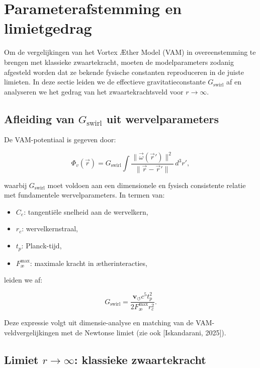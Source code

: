 \section{Parameterafstemming en limietgedrag}\label{sec:appendix_6}

Om de vergelijkingen van het Vortex Æther Model (VAM) in overeenstemming te brengen met klassieke zwaartekracht, moeten de modelparameters zodanig afgesteld worden dat ze bekende fysische constanten reproduceren in de juiste limieten. In deze sectie leiden we de effectieve gravitatieconstante $G_\text{swirl}$ af en analyseren we het gedrag van het zwaartekrachtsveld voor $r \to \infty$.

\subsection{Afleiding van $G_\text{swirl}$ uit wervelparameters}

De VAM-potentiaal is gegeven door:

\begin{equation}
\Phi_v(\vec{r}) = G_\text{swirl} \int \frac{\|\vec{\omega}(\vec{r}')\|^2}{\|\vec{r} - \vec{r}'\|} \, d^3r',
\end{equation}

waarbij $G_\text{swirl}$ moet voldoen aan een dimensionele en fysisch consistente relatie met fundamentele wervelparameters. In termen van:

\begin{itemize}
  \item $C_e$: tangentiële snelheid aan de wervelkern,
  \item $r_c$: wervelkernstraal,
  \item $t_p$: Planck-tijd,
  \item $F^{\text{max}}_{\text{\ae}}$: maximale kracht in ætherinteracties,
\end{itemize}

leiden we af:

\begin{equation}
G_\text{swirl} = \frac{\mathbf{v}_{\scriptscriptstyle\boldsymbol{\circlearrowleft}} c^5 t_p^2}{2 F^{\text{max}}_{\text{\ae}} r_c^2}.
\end{equation}

Deze expressie volgt uit dimensie-analyse en matching van de VAM-veldvergelijkingen met de Newtonse limiet (zie ook [Iskandarani, 2025]).

\subsection{Limiet $r \to \infty$: klassieke zwaartekracht}


